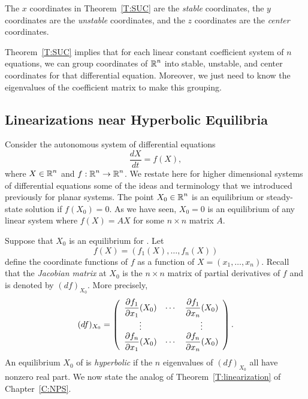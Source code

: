 \documentclass{ximera}
\begin{document}
\begin{definition}
The $x$ coordinates in Theorem~\ref{T:SUC} are the {\em stable\/} coordinates,
the $y$ coordinates are the {\em unstable\/} coordinates, and the $z$ 
coordinates are the {\em center\/} coordinates.
\end{definition} 

Theorem~\ref{T:SUC} implies that for each linear constant coefficient system
of $n$ equations, we can group coordinates of $\mbox{$\Bbb{R}$}^n$ into stable, unstable,
and center coordinates for that differential equation.  Moreover, we just 
need to know the eigenvalues of the coefficient matrix to make this grouping.


\subsection*{Linearizations near Hyperbolic Equilibria}

Consider the autonomous system of differential equations 
\begin{equation} \label{e:eqnn}
\frac{dX}{dt} = f(X),
\end{equation}
where $X\in\mbox{$\Bbb{R}$}^n$ and $f:\mbox{$\Bbb{R}$}^n\to\mbox{$\Bbb{R}$}^n$.  We restate here for higher dimensional 
systems of 
differential equations some of the ideas and terminology that we introduced
previously for planar systems.  The point $X_0\in\mbox{$\Bbb{R}$}^n$ is an equilibrium 
 or steady-state solution 
if $f(X_0)=0$.  As we have seen, 
$X_0=0$ is an equilibrium of any linear system where $f(X)=AX$ for some 
$n\times n$ matrix $A$. 

Suppose that $X_0$ is an equilibrium for .  Let 
\[
f(X) = (f_1(X),\ldots,f_n(X))
\]
define the coordinate functions of $f$ as a function of $X=(x_1,\ldots,x_n)$.
Recall that the {\em Jacobian matrix\/}
at $X_0$ is the $n\times n$ matrix of partial 
derivatives of $f$ and is denoted by $(df)_{X_0}$.  
  More precisely, 
\arraystart
\[
(df)_{X_0} = \left(\begin{array}{ccc}
\displaystyle\frac{\partial f_1}{\partial x_1}(X_0) & \cdots & 
\displaystyle\frac{\partial f_1}{\partial x_n}(X_0) \\ \vdots &  & \vdots \\
\displaystyle\frac{\partial f_n}{\partial x_1}(X_0) & \cdots & 
\displaystyle\frac{\partial f_n}{\partial x_n}(X_0) \end{array}\right).
\]
\arrayfinish
An equilibrium $X_0$ of  is {\em hyperbolic\/} if the $n$
eigenvalues of $(df)_{X_0}$ all have nonzero real part. We now state 
the analog of Theorem~\ref{T:linearization} of Chapter~\ref{C:NPS}.
\end{document}
